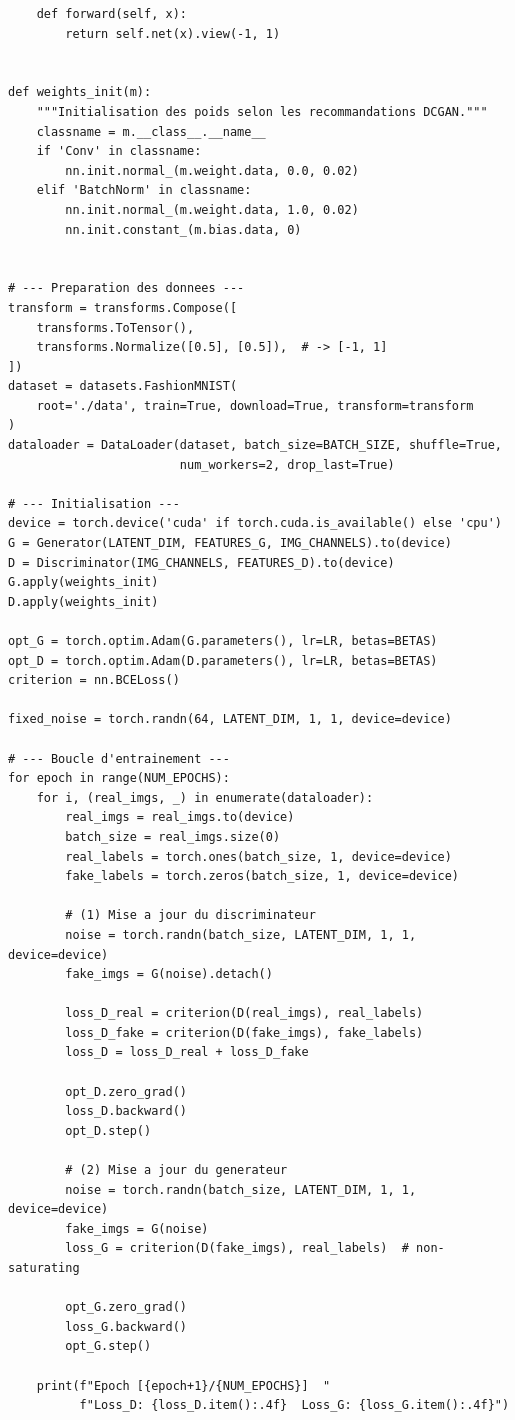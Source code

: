 \begin{codeblock}[title=\textbf{DCGAN complet avec boucle d'entra\^inement}]
\begin{verbatim}
    def forward(self, x):
        return self.net(x).view(-1, 1)


def weights_init(m):
    """Initialisation des poids selon les recommandations DCGAN."""
    classname = m.__class__.__name__
    if 'Conv' in classname:
        nn.init.normal_(m.weight.data, 0.0, 0.02)
    elif 'BatchNorm' in classname:
        nn.init.normal_(m.weight.data, 1.0, 0.02)
        nn.init.constant_(m.bias.data, 0)


# --- Preparation des donnees ---
transform = transforms.Compose([
    transforms.ToTensor(),
    transforms.Normalize([0.5], [0.5]),  # -> [-1, 1]
])
dataset = datasets.FashionMNIST(
    root='./data', train=True, download=True, transform=transform
)
dataloader = DataLoader(dataset, batch_size=BATCH_SIZE, shuffle=True,
                        num_workers=2, drop_last=True)

# --- Initialisation ---
device = torch.device('cuda' if torch.cuda.is_available() else 'cpu')
G = Generator(LATENT_DIM, FEATURES_G, IMG_CHANNELS).to(device)
D = Discriminator(IMG_CHANNELS, FEATURES_D).to(device)
G.apply(weights_init)
D.apply(weights_init)

opt_G = torch.optim.Adam(G.parameters(), lr=LR, betas=BETAS)
opt_D = torch.optim.Adam(D.parameters(), lr=LR, betas=BETAS)
criterion = nn.BCELoss()

fixed_noise = torch.randn(64, LATENT_DIM, 1, 1, device=device)

# --- Boucle d'entrainement ---
for epoch in range(NUM_EPOCHS):
    for i, (real_imgs, _) in enumerate(dataloader):
        real_imgs = real_imgs.to(device)
        batch_size = real_imgs.size(0)
        real_labels = torch.ones(batch_size, 1, device=device)
        fake_labels = torch.zeros(batch_size, 1, device=device)

        # (1) Mise a jour du discriminateur
        noise = torch.randn(batch_size, LATENT_DIM, 1, 1, device=device)
        fake_imgs = G(noise).detach()

        loss_D_real = criterion(D(real_imgs), real_labels)
        loss_D_fake = criterion(D(fake_imgs), fake_labels)
        loss_D = loss_D_real + loss_D_fake

        opt_D.zero_grad()
        loss_D.backward()
        opt_D.step()

        # (2) Mise a jour du generateur
        noise = torch.randn(batch_size, LATENT_DIM, 1, 1, device=device)
        fake_imgs = G(noise)
        loss_G = criterion(D(fake_imgs), real_labels)  # non-saturating

        opt_G.zero_grad()
        loss_G.backward()
        opt_G.step()

    print(f"Epoch [{epoch+1}/{NUM_EPOCHS}]  "
          f"Loss_D: {loss_D.item():.4f}  Loss_G: {loss_G.item():.4f}")
\end{verbatim}
\end{codeblock}

